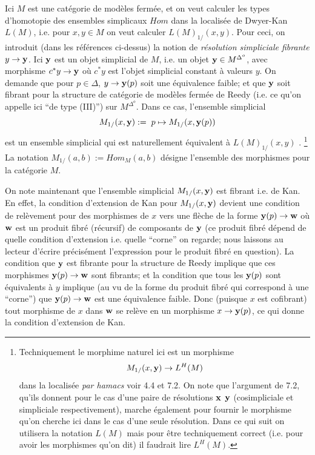 \documentclass[12pt]{article}
\begin{document}
Ici $M$ est une cat\'egorie de mod\`eles ferm\'ee, et on veut
calculer les types d'homotopie des ensembles simplicaux $Hom$ dans la
localis\'ee de Dwyer-Kan $L(M)$, i.e. pour $x,y\in M$ on veut calculer
$L(M)_{1/}(x,y)$. Pour ceci, on introduit (dans les r\'ef\'erences ci-dessus)
la notion de {\em r\'esolution simpliciale fibrante} $y\rightarrow {\bf y}$.
Ici ${\bf y}$ est un objet simplicial de $M$, i.e. un objet ${\bf y}\in
M^{\Delta ^o}$, avec morphisme $c^{\ast} y\rightarrow {\bf y}$ o\`u
$c^{\ast} y$ est l'objet simplicial constant \`a valeurs $y$. On demande que
pour $p\in \Delta$, $y\rightarrow {\bf y}(p)$ soit une \'equivalence faible;
et que ${\bf y}$ soit fibrant pour la structure de cat\'egorie de mod\`eles
ferm\'ee de Reedy (i.e. ce qu'on appelle ici ``de
type (III)'') sur $M^{\Delta ^o}$.
Dans ce cas, l'ensemble simplicial
$$
M_{1/}(x, {\bf y}):= \; p \mapsto M_{1/}(x, {\bf y}(p))
$$
est un ensemble simplicial
qui est naturellement \'equivalent \`a $L(M)_{1/}(x,y)$
\cite{DwyerKan3}.
\footnote{
Techniquement le
morphime naturel ici est un morphisme
$$
M_{1/}(x, {\bf y})\rightarrow L^H(M)
$$
dans la localis\'ee {\em par hamacs} voir \cite{DwyerKan3} 4.4 et 7.2.
On note que l'argument de \cite{DwyerKan3} 7.2, qu'ils donnent pour
le cas d'une paire de r\'esolutions ${\bf x}$ ${\bf y}$ (cosimpliciale et
simpliciale respectivement), marche \'egalement pour fournir le morphisme qu'on
cherche ici dans le cas d'une seule r\'esolution. Dans ce qui suit on utilisera
la notation $L(M)$ mais pour \^etre techniquement correct (i.e. pour avoir les
morphismes qu'on dit) il faudrait lire $L^H(M)$. }
La notation $M_{1/}(a,b):= Hom _M(a,b)$
d\'esigne l'ensemble des morphismes pour la cat\'egorie $M$.


On note maintenant que l'ensemble simplicial $M_{1/}(x, {\bf y})$ est
fibrant i.e. de Kan. En effet, la condition d'extension de Kan pour
$M_{1/}(x, {\bf y})$ devient une condition de rel\`evement pour des morphismes
de $x$ vers une fl\`eche de la forme ${\bf y}(p)\rightarrow {\bf w}$ o\`u
${\bf w}$ est un produit fibr\'e (r\'ecursif) de composants de ${\bf y}$ (ce
produit fibr\'e d\'epend de quelle condition d'extension i.e. quelle
``corne'' on
regarde;  nous laissons au lecteur d'\'ecrire pr\'ecis\'ement l'expression
pour le
produit fibr\'e en question). La condition que ${\bf y}$ est fibrante pour la
structure de Reedy implique que ces morphismes ${\bf y}(p)\rightarrow {\bf w}$
sont fibrants; et la condition que  tous les ${\bf y}(p)$ sont \'equivalents \`a
$y$ implique (au vu de la forme du produit fibr\'e qui correspond \`a une
``corne'') que ${\bf y}(p)\rightarrow {\bf w}$ est une \'equivalence faible.
Donc (puisque $x$ est cofibrant) tout morphisme de $x$ dans  ${\bf w}$ se
rel\`eve en un morphisme $x\rightarrow {\bf y}(p)$, ce qui donne la condition
d'extension de Kan.
\end{document}

